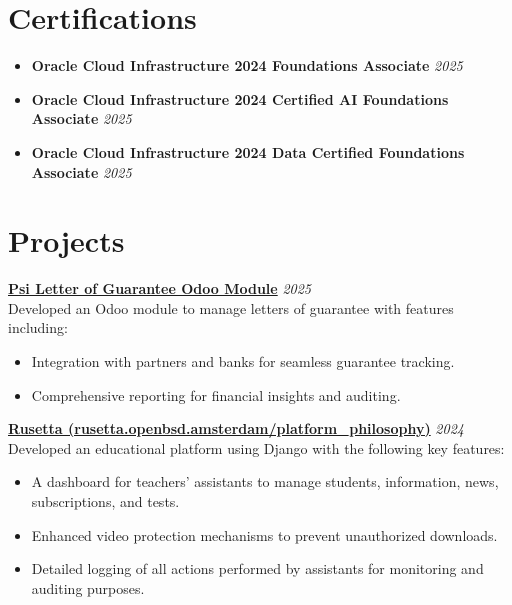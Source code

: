 \documentclass[letterpaper, 10pt]{article}
\begin{document}
\section*{Certifications}
\begin{itemize}[leftmargin=*]
 \item \textbf{Oracle Cloud Infrastructure 2024 Foundations Associate} \hfill \textit{2025}
 \item \textbf{Oracle Cloud Infrastructure 2024 Certified AI Foundations Associate} \hfill \textit{2025}
 \item \textbf{Oracle Cloud Infrastructure 2024 Data Certified Foundations Associate} \hfill \textit{2025}
\end{itemize}


\section*{Projects}

\noindent\textbf{\href{https://github.com/mahmoudElshimi/psi_letter_of_guarantee}{Psi Letter of Guarantee Odoo Module}} \hfill \textit{2025} \\
Developed an Odoo module to manage letters of guarantee with features including:
\begin{itemize}[leftmargin=*]
    \item Integration with partners and banks for seamless guarantee tracking.
    \item Comprehensive reporting for financial insights and auditing.
\end{itemize}
\vspace{0.2cm}

\noindent\textbf{\href{https://rusetta.openbsd.amsterdam/platform_philosophy/}{Rusetta (rusetta.openbsd.amsterdam/platform\_philosophy)}}   \hfill \textit{2024} \\
Developed an educational platform using Django with the following key features:
\begin{itemize}[leftmargin=*]
    \item A dashboard for teachers' assistants to manage students, information, news, subscriptions, and tests.
    \item Enhanced video protection mechanisms to prevent unauthorized downloads.
    \item Detailed logging of all actions performed by assistants for monitoring and auditing purposes.
\end{itemize}

\vspace{0.2cm}
\end{document}

